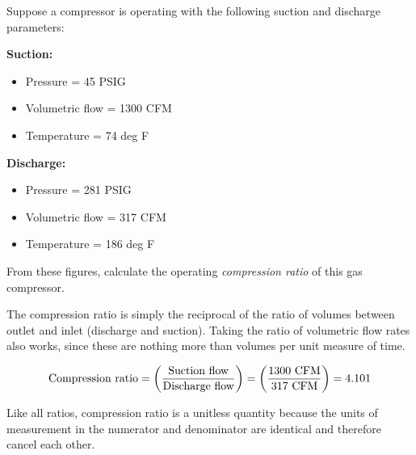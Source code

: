 

Suppose a compressor is operating with the following suction and discharge parameters:

\vskip 10pt

\noindent
{\bf Suction:}
\begin{itemize}
\item{} Pressure = 45 PSIG
\item{} Volumetric flow = 1300 CFM
\item{} Temperature = 74 deg F
\end{itemize}

\vskip 10pt

\noindent
{\bf Discharge:}
\begin{itemize}
\item{} Pressure = 281 PSIG
\item{} Volumetric flow = 317 CFM
\item{} Temperature = 186 deg F
\end{itemize}

\vskip 10pt

From these figures, calculate the operating {\it compression ratio} of this gas compressor.








The compression ratio is simply the reciprocal of the ratio of volumes between outlet and inlet (discharge and suction).  Taking the ratio of volumetric flow rates also works, since these are nothing more than volumes per unit measure of time.  

$$\hbox{Compression ratio} = \left(\hbox{Suction flow} \over \hbox{Discharge flow}\right) = \left(1300 \hbox{ CFM} \over 317 \hbox{ CFM}\right) = 4.101$$

Like all ratios, compression ratio is a unitless quantity because the units of measurement in the numerator and denominator are identical and therefore cancel each other.
 










